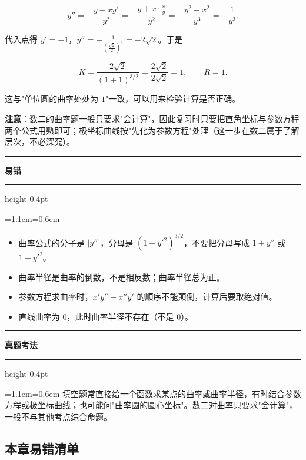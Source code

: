 \documentclass[11pt,openany,UTF8]{ctexbook}
\newcommand{\callouthead}[2]{%
  \par\addvspace{7pt}\noindent
  {\color{#1}\rule[-0.15em]{3pt}{1.05em}}\hspace{0.5em}%
  {\bfseries\color{#1}#2}\par\nobreak\vspace{-0.35em}%
  {\color{rulesep}\hrule height 0.4pt}\nobreak\vspace{0.45em}%
  \begingroup\small\setlength{\parindent}{0pt}%
  \leftskip=1.1em\rightskip=0.6em\noindent\ignorespaces}
\newcommand{\calloutend}{\par\endgroup\addvspace{7pt}}
\newenvironment{callwarn}[1]{\callouthead{warnbar}{#1}}{\calloutend}
\newenvironment{callexam}[1]{\callouthead{exambar}{#1}}{\calloutend}
\begin{document}
\[y''=-\frac{y-xy'}{y^2}=-\frac{y+x\cdot\frac xy}{y^2}=-\frac{y^2+x^2}{y^3}=-\frac{1}{y^3}.\]

代入点得 $y'=-1$，$y''=-\frac{1}{\left(\frac{\sqrt2}{2}\right)^3}=-2\sqrt2$。于是

\[K=\frac{2\sqrt2}{\left(1+1\right)^{3/2}}=\frac{2\sqrt2}{2\sqrt2}=1,\qquad R=1 .\]

这与"单位圆的曲率处处为 $1$"一致，可以用来检验计算是否正确。

\textbf{注意}：数二的曲率题一般只要求"会计算"，因此复习时只要把直角坐标与参数方程两个公式用熟即可；极坐标曲线按"先化为参数方程"处理（这一步在数二属于了解层次，不必深究）。

\begin{callwarn}{易错}
\begin{itemize}
\item 曲率公式的分子是 $|y''|$，分母是 $(1+y'^2)^{3/2}$，不要把分母写成 $1+y''$ 或 $1+y'^2$。
\item 曲率半径是曲率的倒数，不是相反数；曲率半径总为正。
\item 参数方程求曲率时，$x'y''-x''y'$ 的顺序不能颠倒，计算后要取绝对值。
\item 直线曲率为 0，此时曲率半径不存在（不是 $0$）。
\end{itemize}
\end{callwarn}

\begin{callexam}{真题考法}
填空题常直接给一个函数求某点的曲率或曲率半径，有时结合参数方程或极坐标曲线；也可能问"曲率圆的圆心坐标"。数二对曲率只要求"会计算"，一般不与其他考点综合命题。

\end{callexam}

\subsection*{本章易错清单}
\end{document}

